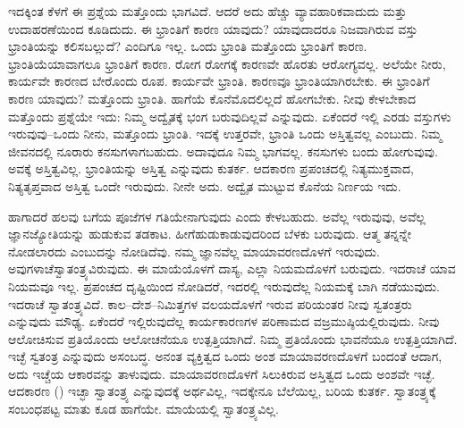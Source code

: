ಇದಕ್ಕಿಂತ ಕೆಳಗೆ ಈ ಪ್ರಶ್ನೆಯ ಮತ್ತೊಂದು ಭಾಗವಿದೆ. ಆದರೆ ಅದು ಹೆಚ್ಚು ವ್ಯಾವಹಾರಿಕವಾದುದು ಮತ್ತು ಉದಾಹರಣೆಯಿಂದ ಕೂಡಿದುದು. ಈ ಭ್ರಾಂತಿಗೆ ಕಾರಣ ಯಾವುದು? ಯಾವುದಾದರೂ ನಿಜವಾಗಿರುವ ವಸ್ತು ಭ್ರಾಂತಿಯನ್ನು ಕಲಿಸಬಲ್ಲುದೆ? ಎಂದಿಗೂ ಇಲ್ಲ. ಒಂದು ಭ್ರಾಂತಿ ಮತ್ತೊಂದು ಭ್ರಾಂತಿಗೆ ಕಾರಣ. ಭ್ರಾಂತಿಯೆ\break ಯಾವಾಗಲೂ ಭ್ರಾಂತಿಗೆ ಕಾರಣ. ರೋಗ ರೋಗಕ್ಕೆ ಕಾರಣವೇ ಹೊರತು ಆರೋಗ್ಯವಲ್ಲ. ಅಲೆಯೇ ನೀರು, ಕಾರ್ಯವೇ ಕಾರಣದ ಬೇರೊಂದು ರೂಪ. ಕಾರ್ಯವೇ ಭ್ರಾಂತಿ. ಕಾರಣವೂ ಭ್ರಾಂತಿಯಾಗಿರಬೇಕು. ಈ ಭ್ರಾಂತಿಗೆ ಕಾರಣ ಯಾವುದು? ಮತ್ತೊಂದು ಭ್ರಾಂತಿ. ಹಾಗೆಯೆ ಕೊನೆಮೊದಲಿಲ್ಲದೆ ಹೋಗಬೇಕು. ನೀವು ಕೇಳಬೇಕಾದ ಮತ್ತೊಂದು ಪ್ರಶ್ನೆಯೇ ಇದು: ನಿಮ್ಮ ಅದ್ವೈತಕ್ಕೆ ಭಂಗ ಬರುವುದಿಲ್ಲವೆ ಎನ್ನುವುದು. ಏಕೆಂದರೆ ಇಲ್ಲಿ ಎರಡು ವಸ್ತುಗಳು ಇರುವುವು–ಒಂದು ನೀನು, ಮತ್ತೊಂದು ಭ್ರಾಂತಿ. ಇದಕ್ಕೆ ಉತ್ತರವೇ, ಭ್ರಾಂತಿ ಒಂದು ಅಸ್ತಿತ್ವವಲ್ಲ ಎಂಬುದು. ನಿಮ್ಮ ಜೀವನದಲ್ಲಿ ನೂರಾರು ಕನಸುಗಳಾಗಬಹುದು. ಅದಾವುದೂ ನಿಮ್ಮ ಭಾಗವಲ್ಲ. ಕನಸುಗಳು ಬಂದು ಹೋಗುವುವು. ಅವಕ್ಕೆ ಅಸ್ತಿತ್ವವಿಲ್ಲ. ಭ್ರಾಂತಿಯನ್ನು ಅಸ್ತಿತ್ವ ಎನ್ನುವುದು ಕುತರ್ಕ. ಆದಕಾರಣ ಪ್ರಪಂಚದಲ್ಲಿ ನಿತ್ಯಮುಕ್ತವಾದ, ನಿತ್ಯತೃಪ್ತವಾದ ಅಸ್ತಿತ್ವ ಒಂದೇ ಇರುವುದು. ನೀನೇ ಅದು. ಅದ್ವೈತ ಮುಟ್ಟುವ ಕೊನೆಯ ನಿರ್ಣಯ ಇದು.

ಹಾಗಾದರೆ ಹಲವು ಬಗೆಯ ಪೂಜೆಗಳ ಗತಿಯೇನಾಗುವುದು ಎಂದು ಕೇಳಬಹುದು. ಅವೆಲ್ಲ ಇರುವುವು, ಅವೆಲ್ಲ ಜ್ಞಾನಜ್ಯೋತಿಯನ್ನು ಹುಡುಕುವ ತಡಕಾಟ. ಹೀಗೆ\break ಹುಡುಕಾಡುವುದರಿಂದ ಬೆಳಕು ಬರುವುದು. ಆತ್ಮ ತನ್ನನ್ನೇ ನೋಡಲಾರದು ಎಂಬುದನ್ನು ನೋಡಿದೆವು. ನಮ್ಮ ಜ್ಞಾನವೆಲ್ಲ ಮಾಯಾವರಣದೊಳಗೆ ಇರುವುದು. ಅವುಗಳಾಚೆ\break ಸ್ವಾತಂತ್ರ್ಯವಿರುವುದು. ಈ ಮಾಯೆಯೊಳಗೆ ದಾಸ್ಯ, ಎಲ್ಲಾ ನಿಯಮದೊಳಗೆ ಬರುವುದು. ಇದರಾಚೆ ಯಾವ ನಿಯಮವೂ ಇಲ್ಲ. ಪ್ರಪಂಚದ ದೃಷ್ಟಿಯಿಂದ ನೋಡಿದರೆ, ಇದರಲ್ಲಿ ಇರುವುದೆಲ್ಲ ನಿಯಮಕ್ಕೆ ಬಾಗಿ ನಡೆಯುವುದು. ಇದರಾಚೆ ಸ್ವಾತಂತ್ರ್ಯವಿದೆ. ಕಾಲ–ದೇಶ–ನಿಮಿತ್ತಗಳ ವಲಯದೊಳಗೆ ಇರುವ ಪರಿಯಂತರ ನೀವು ಸ್ವತಂತ್ರರು ಎನ್ನುವುದು ಮೌಢ್ಯ. ಏಕೆಂದರೆ ಇಲ್ಲಿರುವುದೆಲ್ಲ ಕಾರ್ಯಕಾರಣಗಳ ಪರಿಣಾಮದ ವಜ್ರಮುಷ್ಠಿಯಲ್ಲಿರುವುದು. ನೀವು ಆಲೋಚಿಸುವ ಪ್ರತಿಯೊಂದು ಆಲೋಚನೆಯೂ ಉತ್ಪತ್ತಿಯಾಗಿದೆ. ನಿಮ್ಮ ಪ್ರತಿಯೊಂದು ಭಾವನೆಯೂ ಉತ್ಪತ್ತಿಯಾಗಿದೆ. ಇಚ್ಛೆ ಸ್ವತಂತ್ರ ಎನ್ನುವುದು ಅಸಂಬದ್ಧ. ಅನಂತ ವ್ಯಕ್ತಿತ್ವದ ಒಂದು ಅಂಶ ಮಾಯಾವರಣದೊಳಗೆ ಬಂದಂತೆ ಆದಾಗ, ಅದು ಇಚ್ಚೆಯ ಆಕಾರವನ್ನು ತಾಳುವುದು. ಮಾಯಾವರಣದೊಳಗೆ ಸಿಲುಕಿರುವ ಅಸ್ತಿತ್ವದ ಒಂದು ಅಂಶವೇ ಇಚ್ಛೆ. ಆದಕಾರಣ () ಇಚ್ಛಾ ಸ್ವಾತಂತ್ರ್ಯ ಎನ್ನುವುದಕ್ಕೆ ಅರ್ಥವಿಲ್ಲ, ಇದಕ್ಕೇನೂ ಬೆಲೆಯಿಲ್ಲ, ಬರಿಯ ಕುತರ್ಕ. ಸ್ವಾತಂತ್ರ್ಯಕ್ಕೆ ಸಂಬಂಧಪಟ್ಟ ಮಾತು ಕೂಡ ಹಾಗೆಯೇ. ಮಾಯೆಯಲ್ಲಿ ಸ್ವಾತಂತ್ರ್ಯವಿಲ್ಲ.

